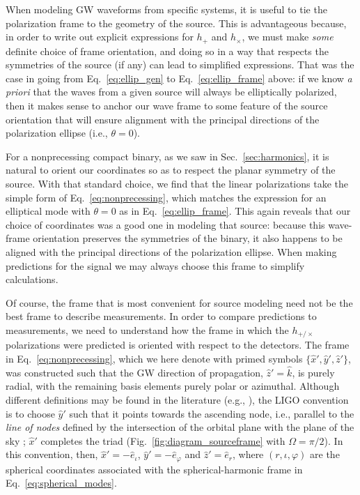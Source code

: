 \documentclass[aps,prd,twocolumn,superscriptaddress,preprintnumbers,floatfix,nofootinbib]{revtex4-2}
\newcommand*{\eq}[1]{Eq.~\eqref{eq:#1}}
\begin{document}
When modeling GW waveforms from specific systems, it is useful to tie the polarization frame to the geometry of the source.
This is advantageous because, in order to write out explicit expressions for $h_+$ and $h_\times$, we must make \emph{some} definite choice of frame orientation, and doing so in a way that respects the symmetries of the source (if any) can lead to simplified expressions.
That was the case in going from Eq.~\eqref{eq:ellip_gen} to Eq.~\eqref{eq:ellip_frame} above: if we know \emph{a priori} that the waves from a given source will always be elliptically polarized, then it makes sense to anchor our wave frame to some feature of the source orientation that will ensure alignment with the principal directions of the polarization ellipse (i.e., $\theta=0$).

For a nonprecessing compact binary, as we saw in Sec.~\ref{sec:harmonics}, it is natural to orient our coordinates so as to respect the planar symmetry of the source.
With that standard choice, we find that the linear polarizations take the simple form of \eq{nonprecessing}, which matches the expression for an elliptical mode with $\theta=0$ as in \eq{ellip_frame}.
This again reveals that our choice of coordinates was a good one in modeling that source: because this wave-frame orientation preserves the symmetries of the binary, it also happens to be aligned with the principal directions of the polarization ellipse.
%
When making predictions for the signal we may always choose this frame to simplify calculations.

Of course, the frame that is most convenient for source modeling need not be the best frame to describe measurements.
In order to compare predictions to measurements, we need to understand how the frame in which the $h_{+/\times}$ polarizations were predicted is oriented with respect to the detectors.
The frame in \eq{nonprecessing}, which we here denote with primed symbols $\{\hat{x}', \hat{y}', \hat{z}'\}$, was constructed such that the GW direction of propagation, $\hat{z}'=\hat{k}$, is purely radial, with the remaining basis elements purely polar or azimuthal.
Although different definitions may be found in the literature (e.g., \cite{Faye:2012we,Kidder:2007rt}), the LIGO convention is to choose $\hat{y}'$ such that it points towards the ascending node, i.e., parallel to the \emph{line of nodes} defined by the intersection of the orbital plane with the plane of the sky \cite{LALSuite:source}; $\hat{x}'$ completes the triad (Fig.~\ref{fig:diagram_sourceframe} with $\Omega = \pi/2$).
In this convention, then, $\hat{x}' = -\hat{e}_\iota$, $\hat{y}' = -\hat{e}_\varphi$ and $\hat{z}'=\hat{e}_r$, where $\left(r, \iota, \varphi\right)$ are the spherical coordinates associated with the spherical-harmonic frame in \eq{spherical_modes}.
\end{document}
